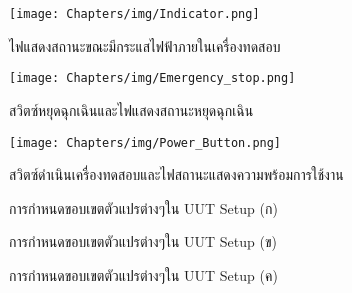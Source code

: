 \begin{center}
	\begin{figure}[H]
		\texttt{[image: Chapters/img/Indicator.png]}
		\centering
		\captionsetup{justification=centering,margin=2cm}
		\caption{ไฟแสดงสถานะขณะมีกระแสไฟฟ้าภายในเครื่องทดสอบ}
		\label{fig:Indicator_light}
	\end{figure}
	\begin{figure}[H]
		\texttt{[image: Chapters/img/Emergency\_stop.png]}
		\centering
		\captionsetup{justification=centering,margin=2cm}
		\caption{สวิตซ์หยุดฉุกเฉินและไฟแสดงสถานะหยุดฉุกเฉิน}
		\label{fig:Emergency_stop}
	\end{figure}
	\begin{figure}[H]
		\texttt{[image: Chapters/img/Power\_Button.png]}
		\centering
		\captionsetup{justification=centering,margin=2cm}
		\caption{สวิตซ์ดำเนินเครื่องทดสอบและไฟสถานะแสดงความพร้อมการใช้งาน}
		\label{fig:Power_button}
	\end{figure}
	\begin{figure}[H]
		\centering
		\captionsetup{justification=centering,margin=2cm}
		\caption{การกำหนดขอบเขตตัวแปรต่างๆใน UUT Setup (ก)}
		\label{fig:UUT1}
	\end{figure}
	\begin{figure}[H]
		\centering
		\captionsetup{justification=centering,margin=2cm}
		\caption{การกำหนดขอบเขตตัวแปรต่างๆใน UUT Setup (ข)}
		\label{UUT2}
	\end{figure}
	\begin{figure}[H]
		\centering
		\captionsetup{justification=centering,margin=2cm}
		\caption{การกำหนดขอบเขตตัวแปรต่างๆใน UUT Setup (ค)}
		\label{UUT3}
	\end{figure}
\end{center}
\pagebreak
